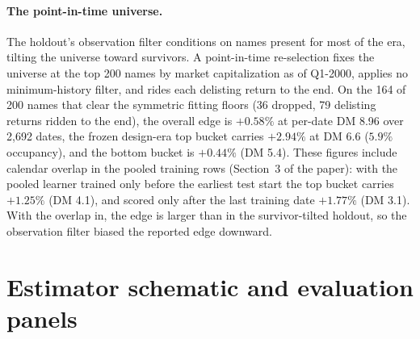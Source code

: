 \documentclass[11pt]{article}
\begin{document}
\paragraph{The point-in-time universe.} The holdout's observation filter conditions on names present for most of the era, tilting the universe toward survivors. A point-in-time re-selection fixes the universe at the top 200 names by market capitalization as of Q1-2000, applies no minimum-history filter, and rides each delisting return to the end. On the 164 of 200 names that clear the symmetric fitting floors (36 dropped, 79 delisting returns ridden to the end), the overall edge is $+0.58\%$ at per-date DM 8.96 over 2{,}692 dates, the frozen design-era top bucket carries $+2.94\%$ at DM 6.6 ($5.9\%$ occupancy), and the bottom bucket is $+0.44\%$ (DM 5.4). These figures include calendar overlap in the pooled training rows (Section~3 of the paper): with the pooled learner trained only before the earliest test start the top bucket carries $+1.25\%$ (DM 4.1), and scored only after the last training date $+1.77\%$ (DM 3.1). With the overlap in, the edge is larger than in the survivor-tilted holdout, so the observation filter biased the reported edge downward.

\section{Estimator schematic and evaluation panels}
\end{document}
